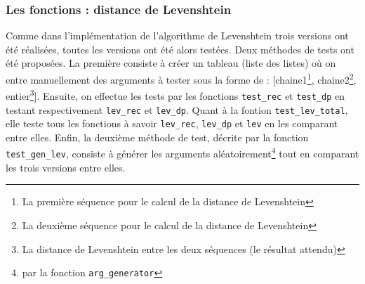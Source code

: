 \documentclass[12pt]{article}
\begin{document}
\subsubsection{Les fonctions : distance de Levenshtein}
Comme dans l'implémentation de l'algorithme de Levenshtein trois versions ont été réalisées, toutes les versions ont été alors testées.
Deux méthodes de tests ont été proposées. La première consiste à créer un tableau (liste des listes) où on entre manuellement des arguments à tester sous la forme de : [chaine1\footnote{La première séquence pour le calcul de la distance de Levenshtein}, chaine2\footnote{La deuxième séquence pour le calcul de la distance de Levenshtein}, entier\footnote{La distance de Levenshtein entre les deux séquences (le résultat attendu) }]. Ensuite, on effectue les tests par les fonctions \texttt{test\_rec} et \texttt{test\_dp} en testant respectivement \texttt{lev\_rec} et \texttt{lev\_dp}. Quant à la fontion \texttt{test\_lev\_total}, elle teste tous les fonctions à savoir \texttt{lev\_rec}, \texttt{lev\_dp} et \texttt{lev} en les comparant entre elles.
Enfin, la deuxième méthode de test, décrite par la fonction \texttt{test\_gen\_lev}, consiste à générer les arguments aléatoirement\footnote{par la fonction \texttt{arg\_generator}} tout en comparant les trois versions entre elles. 
\end{document}
